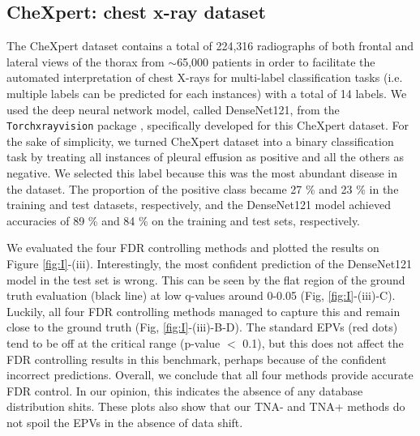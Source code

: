 \documentclass{article}
\begin{document}
\subsection{CheXpert: chest x-ray dataset}

The CheXpert dataset contains a total of 224,316 radiographs of both frontal and lateral views of the thorax from $\sim$65,000 patients in order to facilitate the automated interpretation of chest X-rays for multi-label classification tasks (i.e. multiple labels can be predicted for each instances) with a total of 14 labels. We used the deep neural network model, called DenseNet121, from the \texttt{Torchxrayvision} package \cite{cohen2020limits,Cohen2022xrv}, specifically developed for this CheXpert dataset. For the sake of simplicity, we turned CheXpert dataset into a binary classification task by treating all instances of pleural effusion as positive and all the others as negative. We selected this label because this was the most abundant disease in the dataset. The proportion of the positive class became 27 \% and 23 \% in the training and test datasets, respectively, and the DenseNet121 model achieved accuracies of 89 \% and 84 \% on the training and test sets, respectively.

We evaluated the four FDR controlling methods and plotted the results on Figure \ref{fig:I}-(iii). Interestingly, the most confident prediction of the DenseNet121 model in the test set is wrong. This can be seen by the flat region of the ground truth evaluation (black line) at low q-values around 0-0.05 (Fig, \ref{fig:I}-(iii)-C). Luckily, all four FDR controlling methods managed to capture this and remain close to the ground truth (Fig, \ref{fig:I}-(iii)-B-D). The standard EPVs (red dots) tend to be off at the critical range (p-value $<$ 0.1), but this does not affect the FDR controlling results in this benchmark, perhaps because of the confident incorrect predictions. Overall, we conclude that all four methods provide accurate FDR control. In our opinion, this indicates the absence of any database distribution shits. These plots also show that our TNA- and TNA+ methods do not spoil the EPVs in the absence of data shift.
\end{document}
